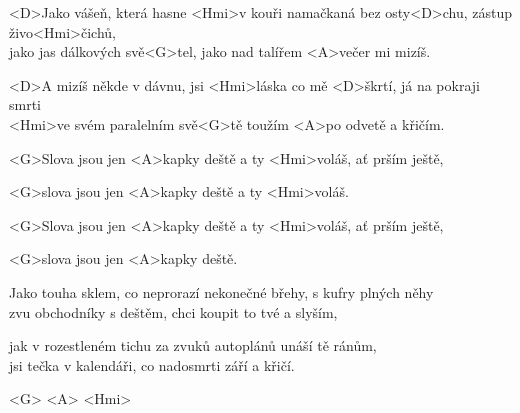 
\zs
<D>Jako vášeň, která hasne <Hmi>v kouři
namačkaná bez osty<D>chu, zástup živo<Hmi>čichů, \\
jako jas dálkových svě<G>tel, jako nad talířem <A>večer
mi mizíš.

<D>A mizíš někde v dávnu,
jsi <Hmi>láska co mě <D>škrtí, já na pokraji smrti \\
<Hmi>ve svém paralelním svě<G>tě toužím <A>po odvetě
a křičím.
\ks
\zr

<G>Slova jsou jen <A>kapky deště a ty <Hmi>voláš, ať prším ještě,

<G>slova jsou jen <A>kapky deště a ty <Hmi>voláš.

<G>Slova jsou jen <A>kapky deště a ty <Hmi>voláš, ať prším 
ještě,

<G>slova jsou jen <A>kapky deště.

\kr
\zs

Jako touha sklem, co neprorazí
nekonečné břehy, s kufry plných něhy \\
zvu obchodníky s deštěm, chci koupit to tvé 
a slyším,

jak v rozestleném tichu
za zvuků autoplánů unáší tě ránům, \\
jsi tečka v kalendáři, co nadosmrti září
a křičí.

\ks
\zr
\kr
\zs

<G> <A> <Hmi> 
\ks
\zr
\kr
\kp
